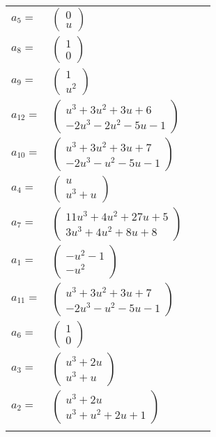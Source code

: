 \documentclass[1p]{elsarticle_modified}
\theoremstyle{definition}
\begin{document}
\begin{tabular}{m{7pt} m{180pt} m{7pt} m{180pt} }
\flushright $a_{5}=$&$\begin{pmatrix}0\\u\end{pmatrix}$ \\
\flushright $a_{8}=$&$\begin{pmatrix}1\\0\end{pmatrix}$ \\
\flushright $a_{9}=$&$\begin{pmatrix}1\\u^2\end{pmatrix}$ \\
\flushright $a_{12}=$&$\begin{pmatrix}u^3+3 u^2+3 u+6\\-2 u^3-2 u^2-5 u-1\end{pmatrix}$ \\
\flushright $a_{10}=$&$\begin{pmatrix}u^3+3 u^2+3 u+7\\-2 u^3- u^2-5 u-1\end{pmatrix}$ \\
\flushright $a_{4}=$&$\begin{pmatrix}u\\u^3+u\end{pmatrix}$ \\
\flushright $a_{7}=$&$\begin{pmatrix}11 u^3+4 u^2+27 u+5\\3 u^3+4 u^2+8 u+8\end{pmatrix}$ \\
\flushright $a_{1}=$&$\begin{pmatrix}- u^2-1\\- u^2\end{pmatrix}$ \\
\flushright $a_{11}=$&$\begin{pmatrix}u^3+3 u^2+3 u+7\\-2 u^3- u^2-5 u-1\end{pmatrix}$ \\
\flushright $a_{6}=$&$\begin{pmatrix}1\\0\end{pmatrix}$ \\
\flushright $a_{3}=$&$\begin{pmatrix}u^3+2 u\\u^3+u\end{pmatrix}$ \\
\flushright $a_{2}=$&$\begin{pmatrix}u^3+2 u\\u^3+u^2+2 u+1\end{pmatrix}$\\&\end{tabular}
\end{document}
